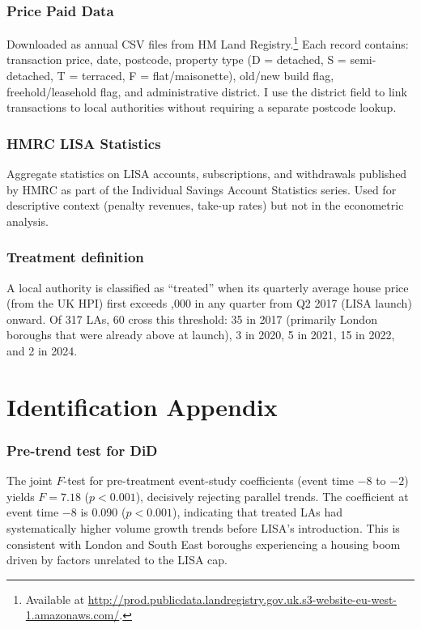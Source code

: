 \documentclass[12pt]{article}
\begin{document}
\subsubsection*{Price Paid Data} Downloaded as annual CSV files from HM Land Registry.\footnote{Available at \url{http://prod.publicdata.landregistry.gov.uk.s3-website-eu-west-1.amazonaws.com/}.} Each record contains: transaction price, date, postcode, property type (D = detached, S = semi-detached, T = terraced, F = flat/maisonette), old/new build flag, freehold/leasehold flag, and administrative district. I use the district field to link transactions to local authorities without requiring a separate postcode lookup.

\subsubsection*{HMRC LISA Statistics} Aggregate statistics on LISA accounts, subscriptions, and withdrawals published by HMRC as part of the Individual Savings Account Statistics series. Used for descriptive context (penalty revenues, take-up rates) but not in the econometric analysis.

\subsubsection*{Treatment definition} A local authority is classified as ``treated'' when its quarterly average house price (from the UK HPI) first exceeds ,000 in any quarter from Q2 2017 (LISA launch) onward. Of 317 LAs, 60 cross this threshold: 35 in 2017 (primarily London boroughs that were already above at launch), 3 in 2020, 5 in 2021, 15 in 2022, and 2 in 2024.

\section{Identification Appendix}

\subsubsection*{Pre-trend test for DiD} The joint $F$-test for pre-treatment event-study coefficients (event time $-8$ to $-2$) yields $F = 7.18$ ($p < 0.001$), decisively rejecting parallel trends. The coefficient at event time $-8$ is 0.090 ($p < 0.001$), indicating that treated LAs had systematically higher volume growth trends before LISA's introduction. This is consistent with London and South East boroughs experiencing a housing boom driven by factors unrelated to the LISA cap.
\end{document}
